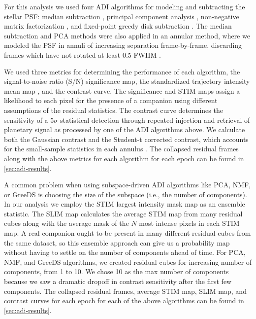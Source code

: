 \documentclass[twocolumn]{aastex631}
\begin{document}
For this analysis we used four ADI algorithms for modeling and subtracting the stellar PSF: median subtraction \citep{marois_angular_2006}, principal component analysis \citep[PCA, also referred to as KLIP;][]{soummer_detection_2012}, non-negative matrix factorization \citep[NMF;][]{ren_non-negative_2018}, and fixed-point greedy disk subtraction \citep[GreeDS;][]{pairet_reference-less_2019,pairet_mayonnaise_2020}. The median subtraction and PCA methods were also applied in an annular method, where we modeled the PSF in annuli of increasing separation frame-by-frame, discarding frames which have not rotated at least 0.5 FWHM \citep{marois_angular_2006}.

We used three metrics for determining the performance of each algorithm, the signal-to-noise ratio (S/N) significance map, the standardized trajectory intensity mean map \citep[STIM map;][]{pairet_stim_2019}, and the contrast curve. The significance and STIM maps assign a likelihood to each pixel for the presence of a companion using different assumptions of the residual statistics. The contrast curve determines the sensitivity of a 5$\sigma$ statistical detection through repeated injection and retrieval of planetary signal as processed by one of the ADI algorithms above. We calculate both the Gaussian contrast and the Student-t corrected contrast, which accounts for the small-sample statistics in each annulus \citep{mawet_fundamental_2014}. The collapsed residual frames along with the above metrics for each algorithm for each epoch can be found in \autoref{sec:adi-results}.

A common problem when using subspace-driven ADI algorithms like PCA, NMF, or GreeDS is choosing the size of the subspace (i.e., the number of components). In our analysis we employ the STIM largest intensity mask map \citep[SLIM map;][]{pairet_signal_2020} as an ensemble statistic. The SLIM map calculates the average STIM map from many residual cubes along with the average mask of the $N$ most intense pixels in each STIM map. A real companion ought to be present in many different residual cubes from the same dataset, so this ensemble approach can give us a probability map without having to settle on the number of components ahead of time. For PCA, NMF, and GreeDS algorithms, we created residual cubes for increasing number of components, from 1 to 10. We chose 10 as the max number of components because we saw a dramatic dropoff in contrast sensitivity after the first few components. The collapsed residual frames, average STIM map, SLIM map, and contrast curves for each epoch for each of the above algorithms can be found in \autoref{sec:adi-results}. 
\end{document}
